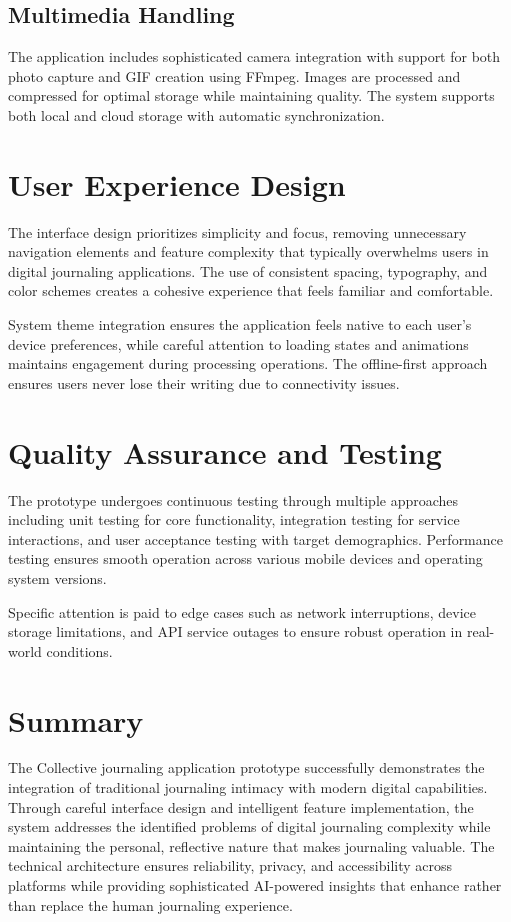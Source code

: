 \subsection{Multimedia Handling}

The application includes sophisticated camera integration with support for both photo capture and GIF creation using FFmpeg. Images are processed and compressed for optimal storage while maintaining quality. The system supports both local and cloud storage with automatic synchronization.

\section{User Experience Design}

The interface design prioritizes simplicity and focus, removing unnecessary navigation elements and feature complexity that typically overwhelms users in digital journaling applications. The use of consistent spacing, typography, and color schemes creates a cohesive experience that feels familiar and comfortable.

System theme integration ensures the application feels native to each user's device preferences, while careful attention to loading states and animations maintains engagement during processing operations. The offline-first approach ensures users never lose their writing due to connectivity issues.

\section{Quality Assurance and Testing}

The prototype undergoes continuous testing through multiple approaches including unit testing for core functionality, integration testing for service interactions, and user acceptance testing with target demographics. Performance testing ensures smooth operation across various mobile devices and operating system versions.

Specific attention is paid to edge cases such as network interruptions, device storage limitations, and API service outages to ensure robust operation in real-world conditions.

\section{Summary}

The Collective journaling application prototype successfully demonstrates the integration of traditional journaling intimacy with modern digital capabilities. Through careful interface design and intelligent feature implementation, the system addresses the identified problems of digital journaling complexity while maintaining the personal, reflective nature that makes journaling valuable. The technical architecture ensures reliability, privacy, and accessibility across platforms while providing sophisticated AI-powered insights that enhance rather than replace the human journaling experience.